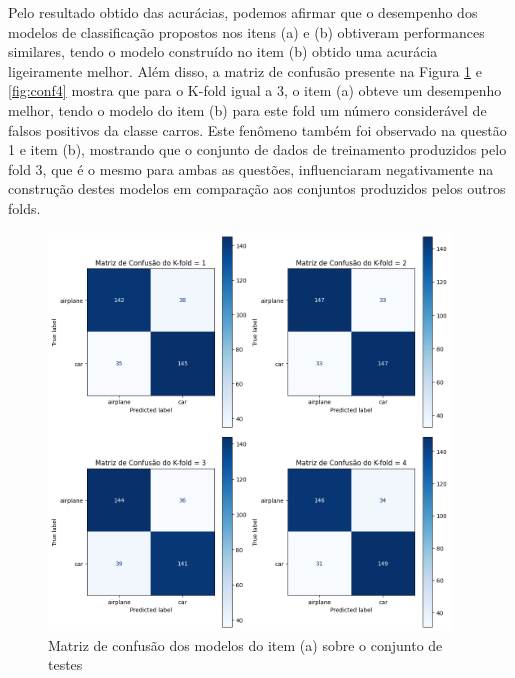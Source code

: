 \documentclass[]{abntex2}
\begin{document}
Pelo resultado obtido das acurácias, podemos afirmar que o desempenho dos modelos de classificação propostos nos itens (a) e (b) obtiveram performances similares, tendo o modelo construído no item (b) obtido uma acurácia ligeiramente melhor. Além disso, a matriz de confusão presente na Figura \ref{fig:conf3} e \ref{fig:conf4} mostra que para o K-fold igual a 3, o item (a) obteve um desempenho melhor, tendo o modelo do item (b) para este fold um número considerável de falsos positivos da classe carros. Este fenômeno também foi observado na questão 1 e item (b), mostrando que o conjunto de dados de treinamento produzidos pelo fold 3, que é o mesmo para ambas as questões, influenciaram negativamente na construção destes modelos em comparação aos conjuntos produzidos pelos outros folds.

\begin{figure}[H]
    \centering 
    \includegraphics[width=0.95\textwidth]{imgs/ex3/conf3.png}
    \caption{Matriz de confusão dos modelos do item (a) sobre o conjunto de testes}
    \label{fig:conf3} %
\end{figure}
\end{document}

